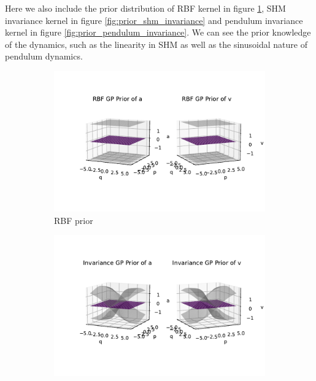 \documentclass{statsmsc}
\begin{document}
Here we also include the prior distribution of RBF kernel in figure \ref{fig:prior_shm_rbf}, SHM invariance kernel in figure \ref{fig:prior_shm_invariance} and pendulum invariance kernel in figure \ref{fig:prior_pendulum_invariance}.
We can see the prior knowledge of the dynamics, such as the linearity in SHM as well as the sinusoidal nature of pendulum dynamics. 
\begin{figure}[H]
     \centering
     \begin{subfigure}[b]{0.5\linewidth}
        \centering
        \includegraphics[width=\linewidth]{../codes/figures/prior_shm_rbf.pdf}
        \caption{RBF prior}
        \label{fig:prior_shm_rbf}
     \end{subfigure}
     \hfill
     \begin{subfigure}[b]{0.5\linewidth}
         \centering
         \includegraphics[width=\linewidth]{../codes/figures/prior_shm_invariance.pdf}

\end{subfigure}
\end{figure}
\end{document}
